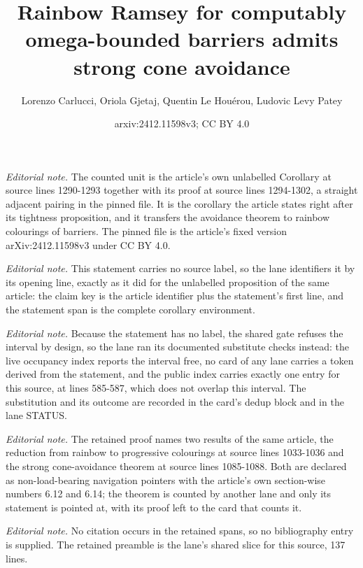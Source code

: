 \documentclass{article}
\title{Rainbow Ramsey for computably omega-bounded barriers admits strong cone avoidance}
\author{Lorenzo Carlucci, Oriola Gjetaj, Quentin Le Houérou, Ludovic Levy Patey}
\date{arxiv:2412.11598v3; CC BY 4.0}
\begin{document}
\maketitle
\noindent\textit{Editorial note.} The counted unit is the article's own unlabelled Corollary at source lines 1290-1293 together with its proof at source lines 1294-1302, a straight adjacent pairing in the pinned file. It is the corollary the article states right after its tightness proposition, and it transfers the avoidance theorem to rainbow colourings of barriers. The pinned file is the article's fixed version arXiv:2412.11598v3 under CC BY 4.0.\par\medskip
\noindent\textit{Editorial note.} This statement carries no source label, so the lane identifiers it by its opening line, exactly as it did for the unlabelled proposition of the same article: the claim key is the article identifier plus the statement's first line, and the statement span is the complete corollary environment.\par\medskip
\noindent\textit{Editorial note.} Because the statement has no label, the shared gate refuses the interval by design, so the lane ran its documented substitute checks instead: the live occupancy index reports the interval free, no card of any lane carries a token derived from the statement, and the public index carries exactly one entry for this source, at lines 585-587, which does not overlap this interval. The substitution and its outcome are recorded in the card's dedup block and in the lane STATUS.\par\medskip
\noindent\textit{Editorial note.} The retained proof names two results of the same article, the reduction from rainbow to progressive colourings at source lines 1033-1036 and the strong cone-avoidance theorem at source lines 1085-1088. Both are declared as non-load-bearing navigation pointers with the article's own section-wise numbers 6.12 and 6.14; the theorem is counted by another lane and only its statement is pointed at, with its proof left to the card that counts it.\par\medskip
\noindent\textit{Editorial note.} No citation occurs in the retained spans, so no bibliography entry is supplied. The retained preamble is the lane's shared slice for this source, 137 lines.\par\medskip
\end{document}
